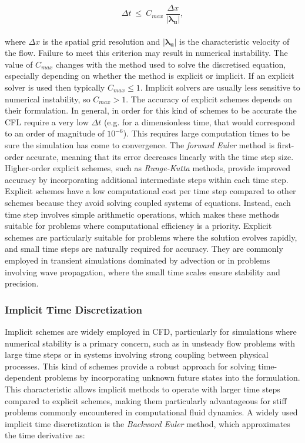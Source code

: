 \documentclass[a5paper]{sapthesis}
\begin{document}
	\begin{equation}
	\Delta t \ \leq \ C_{max} \ \dfrac{\Delta x}{|\mathbf{\lambda_u}|},
	\label{CFL}
	\end{equation}
	\\
	where $\Delta x$ is the spatial grid resolution and $|\mathbf{\lambda_u}|$ is the characteristic velocity of the flow. Failure to meet this criterion may result in numerical instability. The value of $C_{max}$ changes with the method used to solve the discretised equation, especially depending on whether the method is explicit or implicit. If an explicit solver is used then typically $C_{max} \leq 1$. Implicit solvers are usually less sensitive to numerical instability, so $C_{max} > 1$. 
    The accuracy of explicit schemes depends on their formulation.
	In general, in order for this kind of schemes to be accurate the CFL require a very low $\Delta t$ (e.g. for a dimensionless time, that would correspond to an order of magnitude of $10^{-6}$). This requires large computation times to be sure the simulation has come to convergence.
	The \textit{forward Euler} method is first-order accurate, meaning that its error decreases linearly with the time step size. Higher-order explicit schemes, such as \textit{Runge-Kutta} methods, provide improved accuracy by incorporating additional intermediate steps within each time step.
	Explicit schemes have a low computational cost per time step compared to other schemes because they avoid solving coupled systems of equations. Instead, each time step involves simple arithmetic operations, which makes these methods suitable for problems where computational efficiency is a priority.
	Explicit schemes are particularly suitable for problems where the solution evolves rapidly, and small time steps are naturally required for accuracy. They are commonly employed in transient simulations dominated by advection or in problems involving wave propagation, where the small time scales ensure stability and precision.
	
	\subsubsection{Implicit Time Discretization}
	
	Implicit schemes are widely employed in CFD, particularly for simulations where numerical stability is a primary concern, such as in unsteady flow problems with large time steps or in systems involving strong coupling between physical processes.
	This kind of schemes provide a robust approach for solving time-dependent problems by incorporating unknown future states into the formulation. This characteristic allows implicit methods to operate with larger time steps compared to explicit schemes, making them particularly advantageous for stiff problems commonly encountered in computational fluid dynamics. A widely used implicit time discretization is the \textit{Backward Euler}\cite{darwish2016finite} method, which approximates the time derivative as:
	
\end{document}
